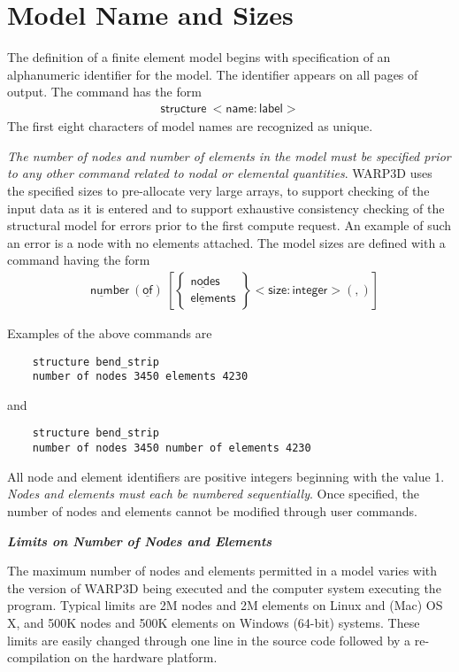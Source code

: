 \documentclass[11pt]{report}
\numberwithin{equation}{section}
\newcommand{\ul} {\underline}
\newcommand{\hv} {\mathsf}   %
\newcommand{\ti}{\emph}
\begin{document}
\section{Model Name and Sizes}
The definition of a finite element model begins with specification 
of an alphanumeric identifier for the model. The identifier appears on all pages 
of output. The command has the form
\begin{align*}
\hv{\ul{struct}ure\ <name:label> } 
\end{align*}
\noindent The first eight characters of model names are recognized
as unique.

\ti{The number of nodes and number of 
elements in the model must be specified prior to any 
other command related to nodal or elemental quantities}. WARP3D uses the specified
sizes to pre-allocate very large arrays, to support checking of the 
input data as it is entered and to support exhaustive 
consistency checking of the structural model for errors prior 
to the first compute request. An example of such 
an error is a node with no elements attached. The model 
sizes are defined with a command having the form
\begin{align*}
& \hv{\ul{num}ber\ (\ul{of})}\ \left [
\begin{Bmatrix}
\hv{\ul{node}s} \\ \hv{\ul{elem}ents}
\end{Bmatrix}
\hv{<size:integer>}(,) \right ]
\end{align*}

\noindent Examples of the above commands are
\small \begin{verbatim}
    structure bend_strip 
    number of nodes 3450 elements 4230
\end{verbatim}\normalsize

\noindent and 

\small \begin{verbatim}
    structure bend_strip 
    number of nodes 3450 number of elements 4230
\end{verbatim}\normalsize

All node and element identifiers are positive integers beginning with the value 1. 
\ti{Nodes and elements must each be numbered sequentially}.
Once specified, the number of nodes and elements cannot be modified 
through user commands.

\noindent \bf{\ti{Limits on Number of Nodes and Elements}}\rm

\noindent The maximum number of nodes and elements permitted in a 
model varies with the version of WARP3D being executed and the computer 
system executing the program. Typical limits are 2M nodes and 2M elements
on Linux and (Mac) OS X, and 500K nodes and 500K elements on Windows
(64-bit) systems. These limits are easily changed 
through one line in the source code followed by a re-compilation 
on the hardware platform.
\end{document}
